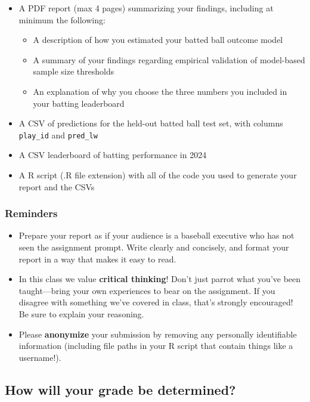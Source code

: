 \documentclass{article}
\begin{document}
        \begin{itemize}
          \item A PDF report (max 4 pages) summarizing your findings, including at minimum the following:
          \begin{itemize}
            \item A description of how you estimated your batted ball outcome model
            \item A summary of your findings regarding empirical validation of model-based sample size thresholds
            \item An explanation of why you choose the three numbers you included in your batting leaderboard
          \end{itemize}
          \item A CSV of predictions for the held-out batted ball test set, with columns \texttt{play\_id} and \texttt{pred\_lw}
          \item A CSV leaderboard of batting performance in 2024
          \item A R script (.R file extension) with all of the code you used to generate your report and the CSVs
        \end{itemize}

      \subsubsection*{\sc Reminders}

        \begin{itemize}
          \item Prepare your report as if your audience is a baseball executive who has not seen the assignment prompt. Write clearly and concisely, and format your report in a way that makes it easy to read.
          \item In this class we value {\bf critical thinking}! Don't just parrot what you've been taught---bring your own experiences to bear on the assignment. If you disagree with something we've covered in class, that's strongly encouraged! Be sure to explain your reasoning.
          \item Please {\bf anonymize} your submission by removing any personally identifiable information (including file paths in your R script that contain things like a username!).
        \end{itemize}

    \subsection*{\sc How will your grade be determined?}
\end{document}
